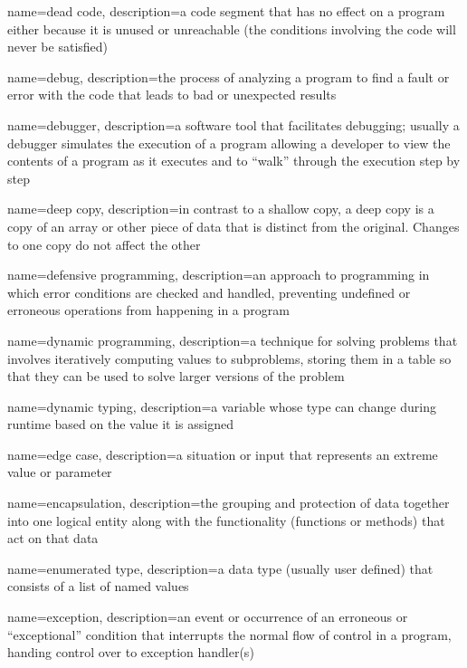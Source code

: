 {
  name=dead code,
  description={a code segment that has no effect on a program either because it is unused or unreachable (the 
	conditions involving the code will never be satisfied)}
}

{
  name=debug,
  description={the process of analyzing a program to find a fault or error with the code that leads to bad or unexpected results}
}

{
  name=debugger,
  description={a software tool that facilitates debugging; usually a debugger simulates the execution of a program allowing a developer to view the contents of a program as it executes and to ``walk'' through the execution step by step}
}

{
  name=deep copy,
  description={in contrast to a shallow copy, a deep copy is a copy of an array or other piece of data that is distinct from the original.  Changes to one copy do not affect the other}
}

{
  name=defensive programming,
  description={an approach to programming in which error conditions are checked and handled, preventing undefined or
  	erroneous operations from happening in a program}
}

{
  name=dynamic programming,
  description={a technique for solving problems that involves iteratively computing values to subproblems, storing them in a table so that they can be used to solve larger versions of the problem}
}

{
  name=dynamic typing,
  description={a variable whose type can change during runtime based on the value it is assigned}
}

{
  name=edge case,
  description={a situation or input that represents an extreme value or parameter}
}

{
  name=encapsulation,
  description={the grouping and protection of data together into one logical entity along with the functionality (functions or methods)
  	that act on that data}
}

{
  name=enumerated type,
  description={a data type (usually user defined) that consists of a list of named values}
}

{
  name=exception,
  description={an event or occurrence of an erroneous or ``exceptional'' condition that interrupts the normal flow of control in a program, handing control over to exception handler(s)}
}

